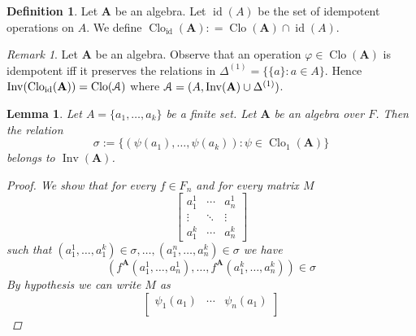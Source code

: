 \documentclass{amsart}
\theoremstyle{plain}
\newtheorem{lemma}[theorem]{Lemma}
\theoremstyle{definition}
\newtheorem{definition}[theorem]{Definition}
\theoremstyle{remark}
\newtheorem{remark}[theorem]{Remark}
\def\phi{\varphi}
\DeclareMathOperator{\Clo}{Clo}
\DeclareMathOperator{\Inv}{Inv}
\DeclareMathOperator{\id}{id}
\begin{document}
\begin{definition}
    Let $\mathbf{A}$ be an algebra. 
    Let $\id(A)$ be the set of idempotent operations on $A$. 
    We define $\Clo_{\id}(\mathbf{A}): = \Clo(\mathbf{A}) \cap \id(A)$. 
\end{definition}

\begin{remark}
    \label{idempotent}
    Let $\mathbf{A}$ be an algebra.  
    Observe that an operation $\phi \in \Clo(\mathbf{A})$ is idempotent iff it preserves the relations in $\Delta^{(1)}=\{\{a\} : a \in A\}$. 
    Hence $\Inv(\Clo_{\id}(\mathbf{A})) = \Clo(\EuScript{A})$ where $\EuScript{A}=(A, \Inv(\mathbf{A}) \cup \Delta^{(1)})$. 
\end{remark}

\begin{lemma}
    \label{clo1_group}
    Let $A=\{a_1, \ldots, a_k\}$ be a finite set. 
    Let $\mathbf{A}$ be an algebra over $F$. 
    Then the relation 
    \begin{equation}
        \sigma:=\{(\psi(a_1), \ldots, \psi(a_k)) : \psi \in \Clo_1(\mathbf{A})\}
    \end{equation}
    belongs to $\Inv(\mathbf{A})$. 
    \begin{proof}
        We show that for every $f \in F_n$ and for every matrix $M$
        \begin{equation*}
            \begin{bmatrix}
              a^1_1 & \cdots & a^1_n \\
              \vdots & \ddots &  \vdots  \\
              a^k_1 & \cdots & a^k_n
              \end{bmatrix}
          \end{equation*}
          such that $(a_1^1, \ldots, a^k_1) \in \sigma, \ldots, (a_1^n, \ldots, a^k_n) \in \sigma$ we have 
          \begin{equation*}
            (f^{\mathbf{A}}(a_1^1, \ldots, a^1_n), \ldots,f^{\mathbf{A}}(a^k_1, \ldots, a^k_n)) \in \sigma
          \end{equation*} 
          By hypothesis we can write $M$ as 
          \begin{equation*}
            \begin{bmatrix}
              \psi_1(a_1) & \cdots & \psi_n(a_1) \\

\end{bmatrix}
\end{equation*}
\end{proof}
\end{lemma}
\end{document}
